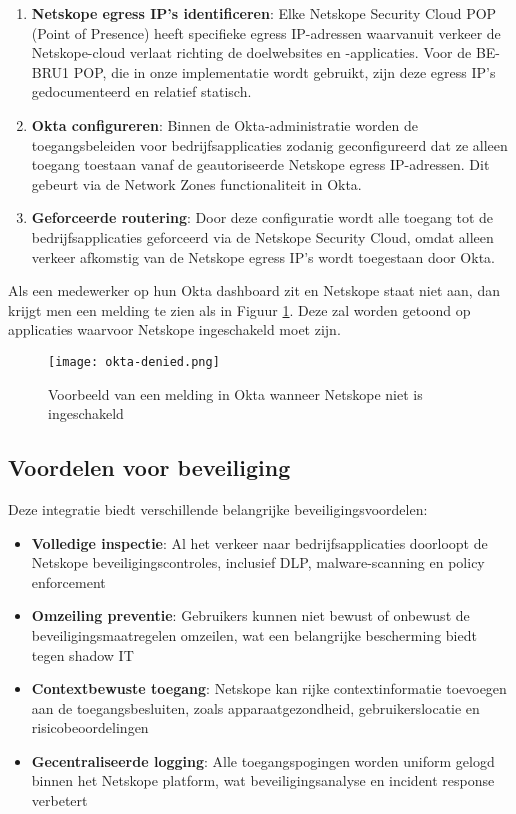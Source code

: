 \begin{enumerate}
    \item \textbf{Netskope egress IP's identificeren}: Elke Netskope Security Cloud POP (Point of Presence) heeft specifieke egress IP-adressen waarvanuit verkeer de Netskope-cloud verlaat richting de doelwebsites en -applicaties. Voor de BE-BRU1 POP, die in onze implementatie wordt gebruikt, zijn deze egress IP's gedocumenteerd en relatief statisch.

    \item \textbf{Okta configureren}: Binnen de Okta-administratie worden de toegangsbeleiden voor bedrijfsapplicaties zodanig geconfigureerd dat ze alleen toegang toestaan vanaf de geautoriseerde Netskope egress IP-adressen. Dit gebeurt via de Network Zones functionaliteit in Okta.

    \item \textbf{Geforceerde routering}: Door deze configuratie wordt alle toegang tot de bedrijfsapplicaties geforceerd via de Netskope Security Cloud, omdat alleen verkeer afkomstig van de Netskope egress IP's wordt toegestaan door Okta.
\end{enumerate}

Als een medewerker op hun Okta dashboard zit en Netskope staat niet aan, dan krijgt men een melding te zien als in Figuur \ref{fig:okta-denied}. Deze zal worden getoond op applicaties waarvoor Netskope ingeschakeld moet zijn.
\begin{figure}[h!]
    \centering
    \texttt{[image: okta-denied.png]}
    \caption[]{Voorbeeld van een melding in Okta wanneer Netskope niet is ingeschakeld}
    \label{fig:okta-denied}
\end{figure}

\subsection{Voordelen voor beveiliging}

Deze integratie biedt verschillende belangrijke beveiligingsvoordelen:

\begin{itemize}
    \item \textbf{Volledige inspectie}: Al het verkeer naar bedrijfsapplicaties doorloopt de Netskope beveiligingscontroles, inclusief DLP, malware-scanning en policy enforcement
    \item \textbf{Omzeiling preventie}: Gebruikers kunnen niet bewust of onbewust de beveiligingsmaatregelen omzeilen, wat een belangrijke bescherming biedt tegen shadow IT
    \item \textbf{Contextbewuste toegang}: Netskope kan rijke contextinformatie toevoegen aan de toegangsbesluiten, zoals apparaatgezondheid, gebruikerslocatie en risicobeoordelingen
    \item \textbf{Gecentraliseerde logging}: Alle toegangspogingen worden uniform gelogd binnen het Netskope platform, wat beveiligingsanalyse en incident response verbetert
\end{itemize}

